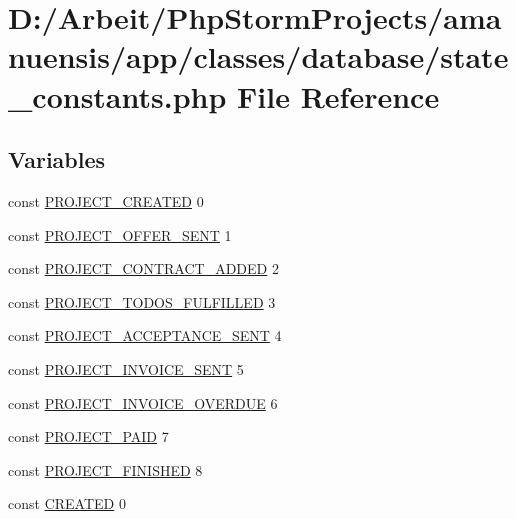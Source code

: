 \hypertarget{state__constants_8php}{}\section{D\+:/\+Arbeit/\+Php\+Storm\+Projects/amanuensis/app/classes/database/state\+\_\+constants.php File Reference}
\label{state__constants_8php}
\subsection*{Variables}
\begin{DoxyCompactItemize}
\item 
const \hyperlink{state__constants_8php_a4a341097343a682ca8ea9c23e1cdb560}{P\+R\+O\+J\+E\+C\+T\+\_\+\+C\+R\+E\+A\+T\+E\+D} 0
\item 
const \hyperlink{state__constants_8php_aa072faf7cc6c64ad2ca9bac6054b7fe7}{P\+R\+O\+J\+E\+C\+T\+\_\+\+O\+F\+F\+E\+R\+\_\+\+S\+E\+N\+T} 1
\item 
const \hyperlink{state__constants_8php_ab8cde643f3b3b85f92bf5dc37e268e12}{P\+R\+O\+J\+E\+C\+T\+\_\+\+C\+O\+N\+T\+R\+A\+C\+T\+\_\+\+A\+D\+D\+E\+D} 2
\item 
const \hyperlink{state__constants_8php_a7a1d70c454bf37dbb98486437d651879}{P\+R\+O\+J\+E\+C\+T\+\_\+\+T\+O\+D\+O\+S\+\_\+\+F\+U\+L\+F\+I\+L\+L\+E\+D} 3
\item 
const \hyperlink{state__constants_8php_ae65c8ef23bca942233c46039fd896f59}{P\+R\+O\+J\+E\+C\+T\+\_\+\+A\+C\+C\+E\+P\+T\+A\+N\+C\+E\+\_\+\+S\+E\+N\+T} 4
\item 
const \hyperlink{state__constants_8php_a96ffbeee4b9b4ccd32a8ecb72f54ceb5}{P\+R\+O\+J\+E\+C\+T\+\_\+\+I\+N\+V\+O\+I\+C\+E\+\_\+\+S\+E\+N\+T} 5
\item 
const \hyperlink{state__constants_8php_a72f941b7cff1071279c48f2f843e7f61}{P\+R\+O\+J\+E\+C\+T\+\_\+\+I\+N\+V\+O\+I\+C\+E\+\_\+\+O\+V\+E\+R\+D\+U\+E} 6
\item 
const \hyperlink{state__constants_8php_a1c3efcfc30778ac340dd341178ec840b}{P\+R\+O\+J\+E\+C\+T\+\_\+\+P\+A\+I\+D} 7
\item 
const \hyperlink{state__constants_8php_abd7589634b87f8da699638ed99f163fd}{P\+R\+O\+J\+E\+C\+T\+\_\+\+F\+I\+N\+I\+S\+H\+E\+D} 8
\item 
const \hyperlink{state__constants_8php_ab09394540835ab7c604a4f2c4824a7c6}{C\+R\+E\+A\+T\+E\+D} 0

\end{DoxyCompactItemize}
